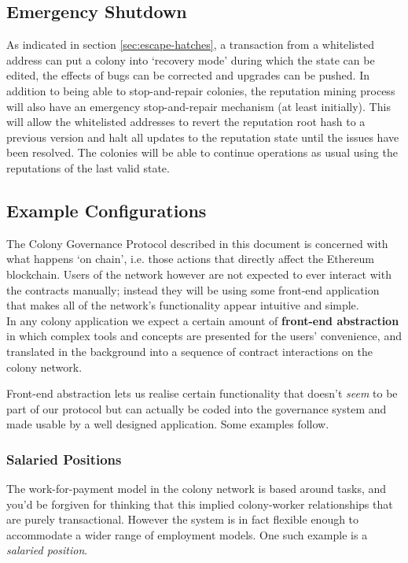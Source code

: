  

\subsection{Emergency Shutdown}\label{sec:big-red-button}
As indicated in section \ref{sec:escape-hatches}, a transaction from a whitelisted address can put a colony into `recovery mode' during which the state can be edited, the effects of bugs can be corrected and upgrades can be pushed. In addition to being able to stop-and-repair colonies, the reputation mining process will also have an emergency stop-and-repair mechanism (at least initially). This will allow the whitelisted addresses to revert the reputation root hash to a previous version and halt all updates to the reputation state until the issues have been resolved. The colonies will be able to continue operations as usual using the reputations of the last valid state.

\subsection{Example Configurations}\label{sec:example-configs}
The Colony Governance Protocol described in this document is concerned with what happens `on chain', i.e. those actions that directly affect the Ethereum blockchain. Users of the network however are not expected to ever interact with the contracts manually; instead they will be using some front-end application that makes all of the network's functionality appear intuitive and simple.\\
In any colony application we expect a certain amount of \textbf{front-end abstraction} in which complex tools and concepts are presented for the users' convenience, and translated in the background into a sequence of contract interactions on the colony network.

Front-end abstraction lets us realise certain functionality that doesn't \emph{seem} to be part of our protocol but can actually be coded into the governance system and made usable by a well designed application. Some examples follow.
%

\subsubsection{Salaried Positions}\label{sec:salary}

The work-for-payment model in the colony network is based around tasks, and you'd be forgiven for thinking that this implied colony-worker relationships that are purely transactional. However the system is in fact flexible enough to accommodate a wider range of employment models. One such example is a \emph{salaried position}.

